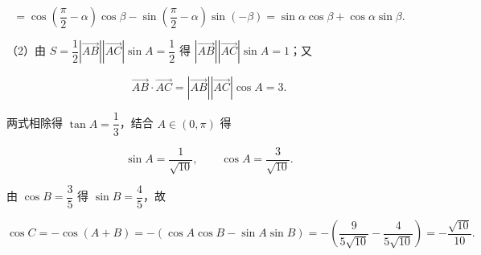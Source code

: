 \begin{answer}
\nopagebreak[4]
\[=\cos\left(\frac\pi2-\alpha\right)\cos\beta-\sin\left(\frac\pi2-\alpha\right)\sin(-\beta)=\sin\alpha\cos\beta+\cos\alpha\sin\beta.\]

（2）由 $S=\dfrac12|\overrightarrow{AB}||\overrightarrow{AC}|\sin A=\dfrac12$ 得 $|\overrightarrow{AB}||\overrightarrow{AC}|\sin A=1$；又

\nopagebreak[4]
\[\overrightarrow{AB}\cdot\overrightarrow{AC}=|\overrightarrow{AB}||\overrightarrow{AC}|\cos A=3.\]

两式相除得 $\tan A=\dfrac13$，结合 $A\in(0,\pi)$ 得

\nopagebreak[4]
\[\sin A=\frac1{\sqrt{10}},\qquad \cos A=\frac3{\sqrt{10}}.\]

由 $\cos B=\dfrac35$ 得 $\sin B=\dfrac45$，故

\nopagebreak[4]
\[\cos C=-\cos(A+B)=-\left(\cos A\cos B-\sin A\sin B\right)=-\left(\frac{9}{5\sqrt{10}}-\frac4{5\sqrt{10}}\right)=-\frac{\sqrt{10}}{10}.\]


\end{answer}
